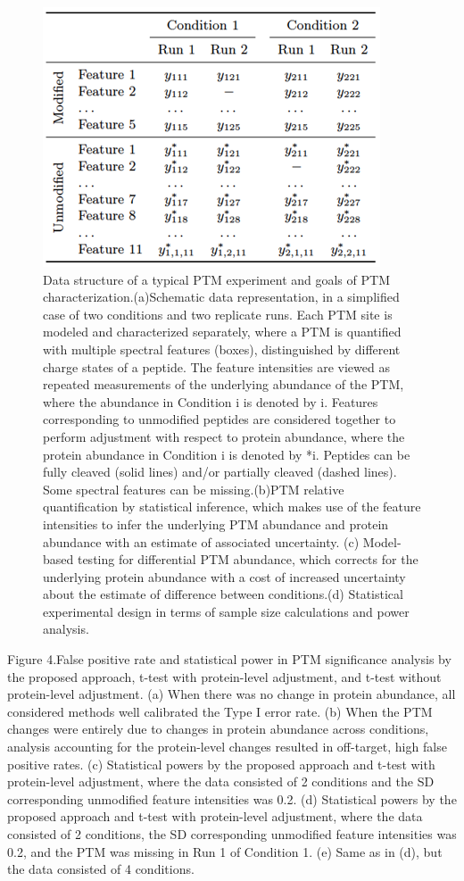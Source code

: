 \documentclass[mcp]{article}
\numberwithin{figure}{section} %
\numberwithin{table}{section}
\begin{document}
\begin{figure}[ht]
\centering
\includegraphics[scale=.8]{images/fig3}
\caption{Data structure of a typical PTM experiment and goals of PTM characterization.(a)Schematic data representation, in a simplified case of two conditions and two replicate runs. Each PTM site is modeled and characterized separately, where a PTM is quantified with multiple spectral features (boxes), distinguished by different charge states of a peptide. The feature intensities are viewed as repeated measurements of the underlying abundance of the PTM, where the abundance in Condition i is denoted by i. Features corresponding to unmodified peptides are considered together to perform adjustment with respect to protein abundance, where the protein abundance in Condition i is denoted by *i. Peptides can be fully cleaved (solid lines) and/or partially cleaved (dashed lines). Some spectral features can be missing.(b)PTM relative quantification by statistical inference, which makes use of the feature intensities to infer the underlying PTM abundance and protein abundance with an estimate of associated uncertainty. (c) Model-based testing for differential PTM abundance, which corrects for the underlying protein abundance with a cost of increased uncertainty about the estimate of difference between conditions.(d) Statistical experimental design in terms of sample size calculations and power analysis.}
\label{fig:data-structure}
\end{figure}


Figure 4.False positive rate and statistical power in PTM significance analysis by the proposed approach, t-test with protein-level adjustment, and t-test without protein-level adjustment. (a) When there was no change in protein abundance, all considered methods well calibrated the Type I error rate. (b) When the PTM changes were entirely due to changes in protein abundance across conditions, analysis accounting for the protein-level changes resulted in off-target, high false positive rates. (c) Statistical powers by the proposed approach and t-test with protein-level adjustment, where the data consisted of 2 conditions and the SD corresponding unmodified feature intensities was 0.2. (d) Statistical powers by the proposed approach and t-test with protein-level adjustment, where the data consisted of 2 conditions, the SD corresponding unmodified feature intensities was 0.2, and the PTM was missing in Run 1 of Condition 1. (e) Same as in (d), but the data consisted of 4 conditions.
\end{document}
